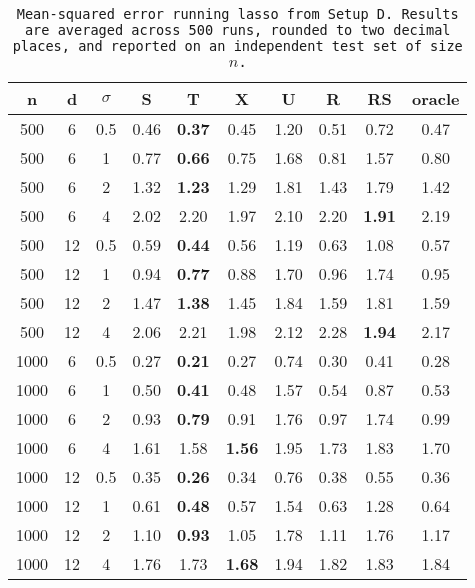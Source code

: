 \begin{table}[ht]
\centering
\begin{tabular}{cccccccccc}
  \hline
n & d & $\sigma$ & S & T & X & U & R & RS & oracle \\ 
  \hline
500 & 6 & 0.5 & 0.46 & \bf 0.37 & 0.45 & 1.20 & 0.51 & 0.72 & 0.47 \\ 
  500 & 6 & 1 & 0.77 & \bf 0.66 & 0.75 & 1.68 & 0.81 & 1.57 & 0.80 \\ 
  500 & 6 & 2 & 1.32 & \bf 1.23 & 1.29 & 1.81 & 1.43 & 1.79 & 1.42 \\ 
  500 & 6 & 4 & 2.02 & 2.20 & 1.97 & 2.10 & 2.20 & \bf 1.91 & 2.19 \\ 
  500 & 12 & 0.5 & 0.59 & \bf 0.44 & 0.56 & 1.19 & 0.63 & 1.08 & 0.57 \\ 
  500 & 12 & 1 & 0.94 & \bf 0.77 & 0.88 & 1.70 & 0.96 & 1.74 & 0.95 \\ 
  500 & 12 & 2 & 1.47 & \bf 1.38 & 1.45 & 1.84 & 1.59 & 1.81 & 1.59 \\ 
  500 & 12 & 4 & 2.06 & 2.21 & 1.98 & 2.12 & 2.28 & \bf 1.94 & 2.17 \\ 
  1000 & 6 & 0.5 & 0.27 & \bf 0.21 & 0.27 & 0.74 & 0.30 & 0.41 & 0.28 \\ 
  1000 & 6 & 1 & 0.50 & \bf 0.41 & 0.48 & 1.57 & 0.54 & 0.87 & 0.53 \\ 
  1000 & 6 & 2 & 0.93 & \bf 0.79 & 0.91 & 1.76 & 0.97 & 1.74 & 0.99 \\ 
  1000 & 6 & 4 & 1.61 & 1.58 & \bf 1.56 & 1.95 & 1.73 & 1.83 & 1.70 \\ 
  1000 & 12 & 0.5 & 0.35 & \bf 0.26 & 0.34 & 0.76 & 0.38 & 0.55 & 0.36 \\ 
  1000 & 12 & 1 & 0.61 & \bf 0.48 & 0.57 & 1.54 & 0.63 & 1.28 & 0.64 \\ 
  1000 & 12 & 2 & 1.10 & \bf 0.93 & 1.05 & 1.78 & 1.11 & 1.76 & 1.17 \\ 
  1000 & 12 & 4 & 1.76 & 1.73 & \bf 1.68 & 1.94 & 1.82 & 1.83 & 1.84 \\ 
   \hline
\end{tabular}
\caption{\tt Mean-squared error running \texttt{lasso} from Setup D. Results are averaged across 500 runs, rounded to two decimal places, and reported on an independent test set of size $n$.} 
\label{table:setup4}
\end{table}
